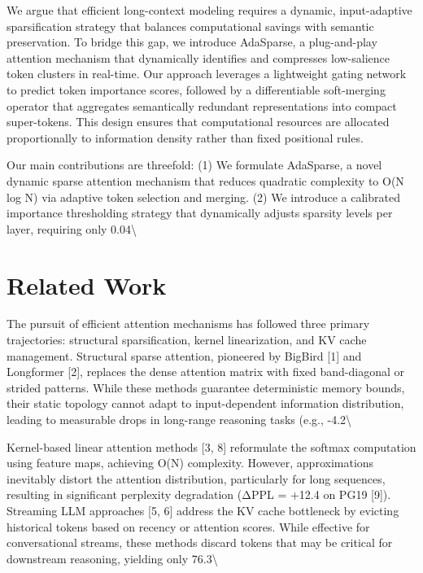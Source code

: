 \documentclass[11pt,a4paper]{article}
\begin{document}
We argue that efficient long-context modeling requires a dynamic, input-adaptive sparsification strategy that balances computational savings with semantic preservation. To bridge this gap, we introduce AdaSparse, a plug-and-play attention mechanism that dynamically identifies and compresses low-salience token clusters in real-time. Our approach leverages a lightweight gating network to predict token importance scores, followed by a differentiable soft-merging operator that aggregates semantically redundant representations into compact super-tokens. This design ensures that computational resources are allocated proportionally to information density rather than fixed positional rules.

Our main contributions are threefold: (1) We formulate AdaSparse, a novel dynamic sparse attention mechanism that reduces quadratic complexity to O(N log N) via adaptive token selection and merging. (2) We introduce a calibrated importance thresholding strategy that dynamically adjusts sparsity levels per layer, requiring only 0.04\textbackslash{}%

\section{Related Work}
The pursuit of efficient attention mechanisms has followed three primary trajectories: structural sparsification, kernel linearization, and KV cache management. Structural sparse attention, pioneered by BigBird [1] and Longformer [2], replaces the dense attention matrix with fixed band-diagonal or strided patterns. While these methods guarantee deterministic memory bounds, their static topology cannot adapt to input-dependent information distribution, leading to measurable drops in long-range reasoning tasks (e.g., -4.2\textbackslash{}%

Kernel-based linear attention methods [3, 8] reformulate the softmax computation using feature maps, achieving O(N) complexity. However, approximations inevitably distort the attention distribution, particularly for long sequences, resulting in significant perplexity degradation (ΔPPL = +12.4 on PG19 [9]). Streaming LLM approaches [5, 6] address the KV cache bottleneck by evicting historical tokens based on recency or attention scores. While effective for conversational streams, these methods discard tokens that may be critical for downstream reasoning, yielding only 76.3\textbackslash{}%
\end{document}
